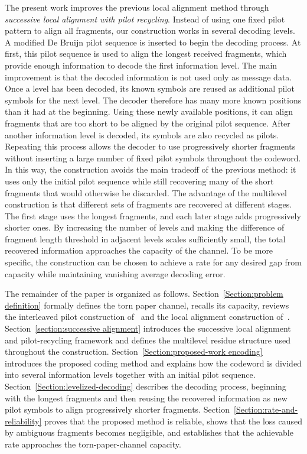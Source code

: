 \documentclass[journal,letterpaper,onecolumn,11pt]{IEEEtran}
\begin{document}
The present work improves the previous local alignment method through \emph{successive local alignment with pilot recycling}. 
Instead of using one fixed pilot pattern to align all fragments, our construction works in several decoding levels. 
A modified De Bruijn pilot sequence is inserted to begin the decoding process. 
At first, this pilot sequence is used to align the longest received fragments, which provide enough information to decode the first information level.
The main improvement is that the decoded information is not used only as message data. 
Once a level has been decoded, its known symbols are reused as additional pilot symbols for the next level. 
The decoder therefore has many more known positions than it had at the beginning. 
Using these newly available positions, it can align fragments that are too short to be aligned by the original pilot sequence. 
After another information level is decoded, its symbols are also recycled as pilots. 
Repeating this process allows the decoder to use progressively shorter fragments without inserting a large number of fixed pilot symbols throughout the codeword.
In this way, the construction avoids the main tradeoff of the previous method: it uses only the initial pilot sequence while still recovering many of the short fragments that would otherwise be discarded.
The advantage of the multilevel construction is that different sets of fragments are recovered at different stages. The first stage uses the longest fragments, and each later stage adds progressively shorter ones. 
By increasing the number of levels and making the difference of fragment length threshold in adjacent levels scales sufficiently small, the total recovered information approaches the capacity of the channel. To be more specific, the construction can be chosen to achieve a rate  for any desired gap from capacity while maintaining vanishing average decoding error. 

The remainder of the paper is organized as follows. Section~\ref{Section:problem definition} formally defines the torn paper channel, recalls its capacity, reviews the interleaved pilot construction of~\cite{shomorony2021torn} and the local alignment construction of~\cite{liu2026improved}.
Section~\ref{section:successive alignment} introduces the successive local alignment and pilot-recycling framework and defines the multilevel residue structure used throughout the construction.
Section~\ref{Section:proposed-work encoding} introduces the proposed coding method and explains how the codeword is divided into several information levels together with an initial pilot sequence. Section~\ref{Section:levelized-decoding} describes the decoding process, beginning with the longest fragments and then reusing the recovered information as new pilot symbols to align progressively shorter fragments. 
Section~\ref{Section:rate-and-reliability} proves that the proposed method is reliable, shows that the loss caused by ambiguous fragments becomes negligible, and establishes that the achievable rate approaches the torn-paper-channel capacity. \
\end{document}

